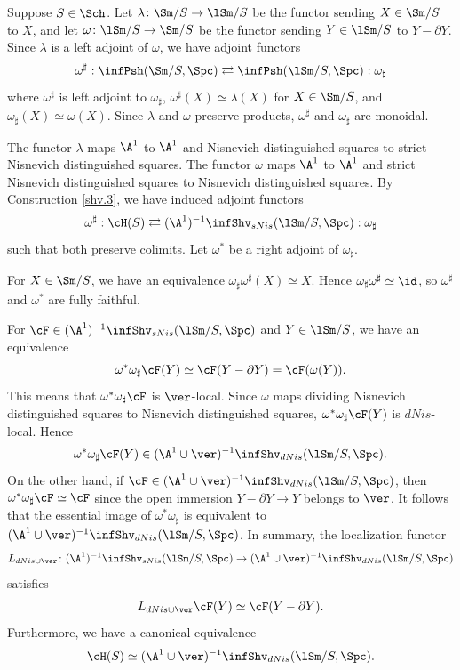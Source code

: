 \documentclass[10pt]{amsart}
\begin{document}
\begin{const}
\label{comp.5}
Suppose $S\in \Sch$.
Let $\lambda\colon \Sm/S\to \lSm/S$ be the functor sending $X\in \Sm/S$ to $X$, and let $\omega\colon \lSm/S\to \Sm/S$ be the functor sending $Y\in \lSm/S$ to $Y-\partial Y$.
Since $\lambda$ is a left adjoint of $\omega$, we have adjoint functors
\begin{equation}
\omega^\sharp
:
\infPsh(\Sm/S,\Spc)
\rightleftarrows
\infPsh(\lSm/S,\Spc)
:
\omega_\sharp
\end{equation}
where $\omega^\sharp$ is left adjoint to $\omega_\sharp$, $\omega^\sharp (X)\simeq \lambda(X)$ for $X\in \Sm/S$, and $\omega_\sharp (X)\simeq \omega(X)$.
Since $\lambda$ and $\omega$ preserve products, $\omega^\sharp$ and $\omega_\sharp$ are monoidal.

The functor $\lambda$ maps $\A^1$ to $\A^1$ and Nisnevich distinguished squares to strict Nisnevich distinguished squares.
The functor $\omega$ maps $\A^1$ to $\A^1$ and strict Nisnevich distinguished squares to Nisnevich distinguished squares.
By Construction \ref{shv.3}, we have induced adjoint functors
\begin{equation}
\label{comp.5.1}
\omega^\sharp
:
\cH(S)
\rightleftarrows
(\A^1)^{-1}\infShv_{sNis}(\lSm/S,\Spc)
:
\omega_\sharp
\end{equation}
such that both preserve colimits.
Let $\omega^*$ be a right adjoint of $\omega_\sharp$.

For $X\in \Sm/S$, we have an equivalence $\omega_\sharp \omega^\sharp (X) \simeq X$.
Hence $\omega_\sharp \omega^\sharp \simeq \id$, so $\omega^\sharp$ and $\omega^*$ are fully faithful.

For $\cF\in (\A^1)^{-1}\infShv_{sNis}(\lSm/S,\Spc)$ and $Y\in \lSm/S$, we have an equivalence
\[
\omega^*\omega_\sharp \cF(Y)
\simeq
\cF(Y-\partial Y)=\cF(\omega(Y)).
\]
This means that $\omega^*\omega_\sharp \cF$ is $\ver$-local.
Since $\omega$ maps dividing Nisnevich distinguished squares to Nisnevich distinguished squares, $\omega^*\omega_\sharp \cF(Y)$ is $dNis$-local.
Hence
\[
\omega^*\omega_\sharp \cF(Y)\in (\A^1\cup \ver)^{-1}\infShv_{dNis}(\lSm/S,\Spc).
\]
On the other hand, if $\cF\in (\A^1\cup \ver)^{-1}\infShv_{dNis}(\lSm/S,\Spc)$, then $\omega^*\omega_\sharp \cF\simeq \cF$ since the open immersion $Y-\partial Y\to Y$ belongs to $\ver$.
It follows that the essential image of $\omega^*\omega_\sharp$ is equivalent to $(\A^1\cup \ver)^{-1}\infShv_{dNis}(\lSm/S,\Spc)$.
In summary, the localization functor
\[
L_{dNis\cup \ver}
\colon
(\A^1)^{-1}\infShv_{sNis}(\lSm/S,\Spc)
\to
(\A^1\cup \ver)^{-1}\infShv_{dNis}(\lSm/S,\Spc)
\]
satisfies
\begin{equation}
\label{comp.5.2}
L_{dNis\cup \ver}\cF(Y)
\simeq
\cF(Y-\partial Y).
\end{equation}
Furthermore, we have a canonical equivalence
\begin{equation}
\label{comp.5.3}
\cH(S)
\simeq
(\A^1\cup \ver)^{-1}\infShv_{dNis}(\lSm/S,\Spc).
\end{equation}
\end{const}
\end{document}
